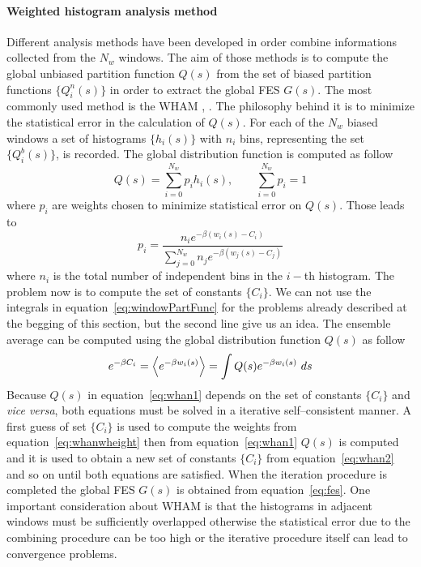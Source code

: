 \paragraph{\textbf{Weighted histogram analysis method}} Different analysis methods have been developed in order 
combine informations collected from the $N_w$ windows. The aim of those methods is to compute the global unbiased 
partition function $Q(s)$ from the set of biased partition functions $\{Q^n_i(s)\}$ in order to extract the 
global \ac{FES} $G(s)$. The most commonly used method is the \ac{WHAM} \cite{WHAM}, \cite{gWHAM}. The philosophy 
behind it is to minimize the statistical error in the calculation of $Q(s)$. For each of the $N_w$ biased windows 
a set of histograms $\{h_i(s)\}$ with $n_i$ bins, representing the set $\{Q^b_i(s)\}$, is recorded. The global 
distribution function is computed as follow
\begin{equation}
	Q(s) = \sum_{i=0}^{N_w} p_i h_i(s), \qquad \sum_{i=0}^{N_w} p_i = 1
	\label{eq:whan1}
\end{equation}
where $p_i$ are weights chosen to minimize statistical error on $Q(s)$. Those leads to
\begin{equation}
	p_i = \frac{n_ie^{-\beta (w_i(s) - C_i)}}{\sum_{j=0}^{N_w} n_je^{-\beta (w_j(s) - C_j)}}
	\label{eq:whanwheight}
\end{equation}
where $n_i$ is the total number of independent bins in the $i-$th histogram. The problem now is to compute the 
set of constants $\{C_i\}$. We can not use the integrals in equation~\eqref{eq:windowPartFunc} for the problems 
already described at the begging of this section, but the second line give us an idea. The ensemble average can 
be computed using the global distribution function $Q(s)$ as follow
\begin{equation}
	e^{-\beta C_i} = \left \langle e^{-\beta w_i(s)} \right \rangle = \int Q(s) e^{-\beta w_i(s)}\ ds
	\label{eq:whan2}
\end{equation} 
Because $Q(s)$ in equation~\eqref{eq:whan1} depends on the set of constants $\{C_i\}$ and \textit{vice versa}, 
both equations must be solved in a iterative self--consistent manner. A first guess of set $\{C_i\}$ is used to 
compute the weights from equation~\eqref{eq:whanwheight} then from equation~\eqref{eq:whan1} $Q(s)$ is computed 
and it is used to obtain a new set of constants $\{C_i\}$ from equation~\eqref{eq:whan2} and so on until both 
equations are satisfied. When the iteration procedure is completed the global \ac{FES} $G(s)$ is obtained from 
equation~\eqref{eq:fes}. One important consideration about \ac{WHAM} is that the histograms in adjacent windows 
must be sufficiently overlapped otherwise the statistical error due to the combining procedure can be too high or 
the iterative procedure itself can lead to convergence problems.

